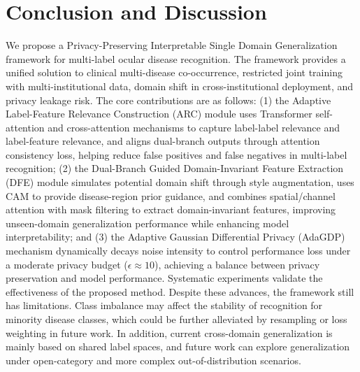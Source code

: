 
\section{Conclusion and Discussion}

We propose a Privacy-Preserving Interpretable Single Domain Generalization framework for multi-label ocular disease recognition. The framework provides a unified solution to clinical multi-disease co-occurrence, restricted joint training with multi-institutional data, domain shift in cross-institutional deployment, and privacy leakage risk. The core contributions are as follows: (1) the Adaptive Label-Feature Relevance Construction (ARC) module uses Transformer self-attention and cross-attention mechanisms to capture label-label relevance and label-feature relevance, and aligns dual-branch outputs through attention consistency loss, helping reduce false positives and false negatives in multi-label recognition; (2) the Dual-Branch Guided Domain-Invariant Feature Extraction (DFE) module simulates potential domain shift through style augmentation, uses CAM to provide disease-region prior guidance, and combines spatial/channel attention with mask filtering to extract domain-invariant features, improving unseen-domain generalization performance while enhancing model interpretability; and (3) the Adaptive Gaussian Differential Privacy (AdaGDP) mechanism dynamically decays noise intensity to control performance loss under a moderate privacy budget (\(\epsilon \approx 10\)), achieving a balance between privacy preservation and model performance. Systematic experiments validate the effectiveness of the proposed method. Despite these advances, the framework still has limitations. Class imbalance may affect the stability of recognition for minority disease classes, which could be further alleviated by resampling or loss weighting in future work. In addition, current cross-domain generalization is mainly based on shared label spaces, and future work can explore generalization under open-category and more complex out-of-distribution scenarios.
